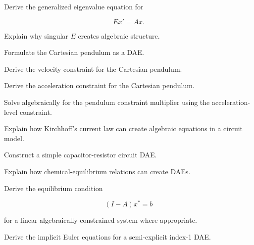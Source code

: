 \begin{exercise}[3]
Derive the generalized eigenvalue equation for

\[
Ex'=Ax.
\]
\end{exercise}

\begin{exercise}[3]
Explain why singular \(E\) creates algebraic structure.
\end{exercise}

\begin{exercise}[3]
Formulate the Cartesian pendulum as a DAE.
\end{exercise}

\begin{exercise}[3]
Derive the velocity constraint for the Cartesian pendulum.
\end{exercise}

\begin{exercise}[3]
Derive the acceleration constraint for the Cartesian pendulum.
\end{exercise}

\begin{exercise}[3]
Solve algebraically for the pendulum constraint multiplier using the
acceleration-level constraint.
\end{exercise}

\begin{exercise}[3]
Explain how Kirchhoff's current law can create algebraic equations in a
circuit model.
\end{exercise}

\begin{exercise}[3]
Construct a simple capacitor-resistor circuit DAE.
\end{exercise}

\begin{exercise}[3]
Explain how chemical-equilibrium relations can create DAEs.
\end{exercise}

\begin{exercise}[3]
Derive the equilibrium condition

\[
(I-A)x^*=b
\]

for a linear algebraically constrained system where appropriate.
\end{exercise}

\begin{exercise}[3]
Derive the implicit Euler equations for a semi-explicit index-1 DAE.
\end{exercise}

